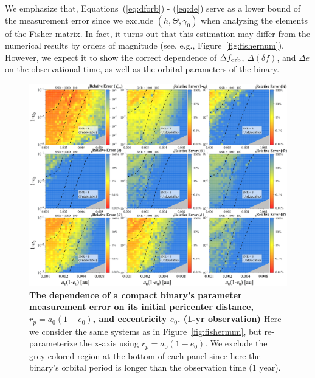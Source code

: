 \documentclass[%
 reprint,
 amsmath,amssymb,
 aps,
]{revtex4-2}
\begin{document}
We emphasize that, Equations~(\ref{eq:dforb}) - (\ref{eq:de}) serve as a lower bound of the measurement error since we exclude $(h,\Theta,\gamma_0)$ when analyzing the elements of the Fisher matrix. In fact, it turns out that this estimation may differ from the numerical results by orders of magnitude (see, e.g., Figure~\ref{fig:fishernum}). However, we expect it to show the correct dependence of $\Delta f_{\rm orb}$, $\Delta (\delta f)$, and $\Delta e$ on the observational time, as well as the orbital parameters of the binary.

\begin{figure}[htbp]
    \centering
    \includegraphics[width=7.5in]{1yr.png} 
    \caption{{\bf{The dependence of a compact binary's parameter measurement error on its initial pericenter distance, $r_p= a_0(1-e_0)$, and eccentricity $e_0$. (1-yr observation) }}
    Here we consider the same systems as in Figure~\ref{fig:fishernum}, but re-parameterize the x-axis using $r_p= a_0(1-e_0)$. We exclude the grey-colored region at the bottom of each panel since here the binary's orbital period is longer than the observation time (1 year).
    }
    \label{fig:fishernum2}
\end{figure}
\end{document}
